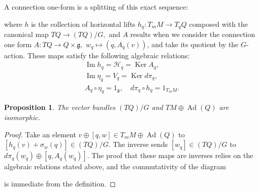 \documentclass[12pt, letterpaper, reqno]{amsart}
\theoremstyle{definition}
\theoremstyle{plain}
\newtheorem{prop}{Proposition}
\theoremstyle{remark}
\begin{document}
A connection one-form is a splitting of this exact sequence:
\begin{center}
\end{center}
where $ h $ is the collection of horizontal lifts $ h_q: T_mM \rightarrow T_qQ $ composed with the canonical map $ TQ \rightarrow (TQ)/G, $ and $ A $ results when we consider the connection one form $ A: TQ \rightarrow Q\times \mathfrak{g}, $ $ w_q \mapsto (q, A_q(v)) $, and take its quotient by the $ G $-action. These maps satisfy the following algebraic relations:
\begin{align*}
\operatorname{Im} h_q = \mathcal{H}_q = \operatorname{Ker} A_q,\\
\operatorname{Im} \eta_q = V_q = \operatorname{Ker} d\pi_q,\\
A_q\circ\eta_q = 1_{ \mathfrak{g}}, \quad d\pi_q\circ h_q = 1_{T_mM}.
\end{align*}

\begin{prop}\label{prop:splitting}
	The vector bundles $ (TQ)/G $ and $ TM\oplus \operatorname{Ad} (Q) $ are isomorphic.
\end{prop}
\begin{proof}
	Take an element $ v\oplus[q,w]\in T_mM\oplus \operatorname{Ad} (Q)  $ to $ [h_q(v)+\sigma_w(q)]\in (TQ)/G. $ The inverse sends $ [w_q]\in (TQ)/G $ to $ d\pi_q(w_q)\oplus [q, A_q(w_q)] $. The proof that these maps are inverses relies on the algebraic relations stated above, and the commutativity of the diagram 
	\begin{center}
	\end{center}
	is immediate from the definition.
\end{proof}
\end{document}
